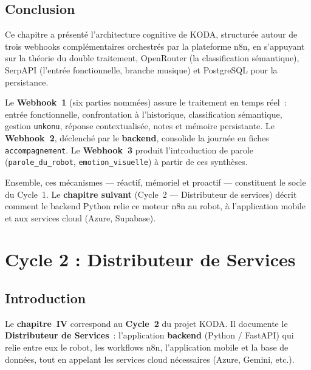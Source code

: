 \documentclass[a4paper,12pt]{report}
\begin{document}
	\section{Conclusion}
	
	
	Ce chapitre a présenté l'architecture cognitive de KODA, structurée autour de trois
	webhooks complémentaires orchestrés par la plateforme n8n, en s'appuyant sur la
	théorie du double traitement, OpenRouter (la classification sémantique), SerpAPI (l'entrée fonctionnelle, branche musique)
	et PostgreSQL pour la persistance.
	
	Le \textbf{Webhook~1} (six parties nommées) assure le traitement en temps réel~:
	entrée fonctionnelle, confrontation à l'historique, classification sémantique,
	gestion \texttt{unkonu}, réponse contextualisée, notes et mémoire persistante.
	Le \textbf{Webhook~2}, déclenché par le \textbf{backend}, consolide la journée en
	fiches \texttt{accompagnement}. Le \textbf{Webhook~3} produit l'introduction de parole
	(\texttt{parole\_du\_robot}, \texttt{emotion\_visuelle}) à partir de ces synthèses.
	
	Ensemble, ces mécanismes — réactif, mémoriel et proactif — constituent le socle du
	Cycle~1. Le \textbf{chapitre suivant} (Cycle~2 --- Distributeur de services) décrit
	comment le backend Python relie ce moteur n8n au robot, à l'application mobile et aux
	services cloud (Azure, Supabase).
	\chapter{Cycle 2 : Distributeur de Services}
	
	\section{Introduction}
	
	Le \textbf{chapitre~IV} correspond au \textbf{Cycle~2} du projet KODA. Il documente le
	\textbf{Distributeur de Services}~: l'application \textbf{backend} (Python / FastAPI)
	qui relie entre eux le robot, les workflows n8n, l'application mobile et la base de
	données, tout en appelant les services cloud nécessaires (Azure, Gemini, etc.).
	
\end{document}
